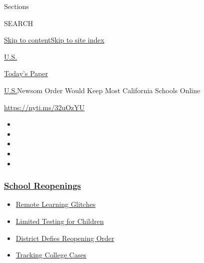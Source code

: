 Sections

SEARCH

\protect\hyperlink{site-content}{Skip to
content}\protect\hyperlink{site-index}{Skip to site index}

\href{https://www.nytimes3xbfgragh.onion/section/us}{U.S.}

\href{https://myaccount.nytimes3xbfgragh.onion/auth/login?response_type=cookie\&client_id=vi}{}

\href{https://www.nytimes3xbfgragh.onion/section/todayspaper}{Today's
Paper}

\href{/section/us}{U.S.}\textbar{}Newsom Order Would Keep Most
California Schools Online

\url{https://nyti.ms/32uOzYU}

\begin{itemize}
\item
\item
\item
\item
\item
\end{itemize}

\hypertarget{school-reopenings}{%
\subsubsection{\texorpdfstring{\href{https://www.nytimes3xbfgragh.onion/spotlight/schools-reopening?name=styln-coronavirus-schools-reopening\&region=TOP_BANNER\&block=storyline_menu_recirc\&action=click\&pgtype=Article\&impression_id=2e750d70-f4c1-11ea-8aec-23400fafd7a4\&variant=undefined}{School
Reopenings}}{School Reopenings}}\label{school-reopenings}}

\begin{itemize}
\tightlist
\item
  \href{https://www.nytimes3xbfgragh.onion/2020/09/08/us/school-districts-cyberattacks-glitches.html?name=styln-coronavirus-schools-reopening\&region=TOP_BANNER\&block=storyline_menu_recirc\&action=click\&pgtype=Article\&impression_id=2e753480-f4c1-11ea-8aec-23400fafd7a4\&variant=undefined}{Remote
  Learning Glitches}
\item
  \href{https://www.nytimes3xbfgragh.onion/2020/09/08/upshot/children-testing-shortfalls-virus.html?name=styln-coronavirus-schools-reopening\&region=TOP_BANNER\&block=storyline_menu_recirc\&action=click\&pgtype=Article\&impression_id=2e753481-f4c1-11ea-8aec-23400fafd7a4\&variant=undefined}{Limited
  Testing for Children}
\item
  \href{https://www.nytimes3xbfgragh.onion/2020/09/10/us/des-moines-school-opening-coronavirus.html?name=styln-coronavirus-schools-reopening\&region=TOP_BANNER\&block=storyline_menu_recirc\&action=click\&pgtype=Article\&impression_id=2e753482-f4c1-11ea-8aec-23400fafd7a4\&variant=undefined}{District
  Defies Reopening Order}
\item
  \href{https://www.nytimes3xbfgragh.onion/interactive/2020/us/covid-college-cases-tracker.html?name=styln-coronavirus-schools-reopening\&region=TOP_BANNER\&block=storyline_menu_recirc\&action=click\&pgtype=Article\&impression_id=2e753483-f4c1-11ea-8aec-23400fafd7a4\&variant=undefined}{Tracking
  College Cases}
\end{itemize}

